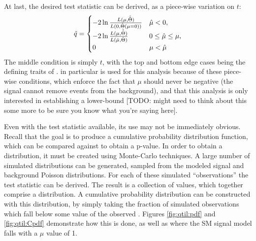     At last, the desired test statistic \qtil can be derived, as a piece-wise variation on $t$\cite{asymptotic_formulae_for_likelihood}:
    \begin{equation}
        \tilde{q} = \begin{cases}
            -2 \ln{\frac{L(\mu, \hat {\hat \Theta})}{L(0, \hat \Theta(\mu=0))}} & \hat \mu < 0,\\
            -2 \ln{\frac{L(\mu, \hat {\hat \Theta})}{L(\hat \mu, \hat \Theta)}} & 0 \leq \hat \mu \leq \mu,\\
            0 & \mu < \hat \mu 
        \end{cases}
    \end{equation}
    The middle condition is simply $t$, with the top and bottom edge cases being the defining traits of \qtil.
    \qtil in particular is used for this analysis because of these piece-wise conditions,
        which enforce the fact that $\mu$ should never be negative (the signal cannot remove events from the background),
        and that this analysis is only interested in establishing a lower-bound
        [TODO: might need to think about this some more to be sure you know what you're saying here].

    Even with the test statistic \qtil available, its use may not be immediately obvious.
    Recall that the goal is to produce a cumulative probability distribution function,
        which can be compared against to obtain a p-value.
    In order to obtain a distribution, it must be created using Monte-Carlo techniques.
    A large number of simulated distributions can be generated,
        sampled from the modeled signal and background Poisson distributions.
    For each of these simulated ``observations'' the test statistic \qtil can be derived.
    The result is a collection of \qtil values, which together comprise a distribution.
    A cumulative probability distribution can be constructed with this distribution,
        by simply taking the fraction of simulated observations which fall below some value of the observed \qtil.
    Figures \ref{fig:qtil:pdf} and \ref{fig:qtil:Cpdf} demonstrate how this is done,
        as well as where the SM signal model falls with a $\mu$ value of 1.

